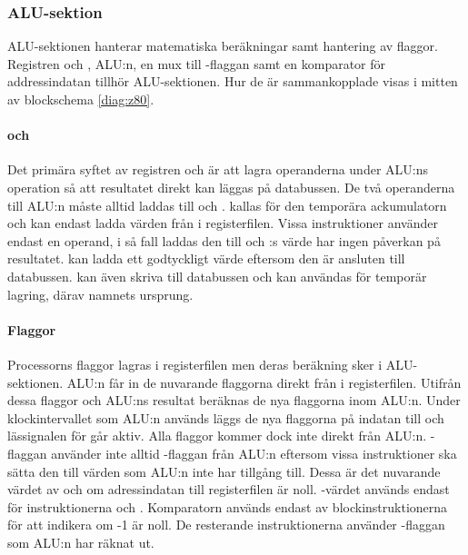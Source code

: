 \documentclass[main.tex]{subfiles}
\begin{document}
\newpage
\subsubsection{ALU-sektion}
ALU-sektionen hanterar matematiska beräkningar samt hantering av flaggor.
Registren  och , ALU:n, en mux till -flaggan samt
en komparator för addressindatan tillhör ALU-sektionen. Hur de är
sammankopplade visas i mitten av blockschema \ref{diag:z80}.

\paragraph{ och }
Det primära syftet av registren  och  är att lagra
operanderna under ALU:ns operation så att resultatet direkt kan läggas på
databussen. De två operanderna till ALU:n måste alltid laddas till 
och .  kallas för den temporära ackumulatorn och kan endast
ladda värden från  i registerfilen. Vissa instruktioner använder endast
en operand, i så fall laddas den till  och :s värde har
ingen påverkan på resultatet.  kan ladda ett godtyckligt värde
eftersom den är ansluten till databussen.  kan även skriva till
databussen och kan användas för temporär lagring, därav namnets ursprung.

\paragraph{Flaggor}
Processorns flaggor lagras i registerfilen men deras beräkning sker i
ALU-sektionen. ALU:n får in de nuvarande flaggorna direkt från  i
registerfilen. Utifrån dessa flaggor och ALU:ns resultat beräknas de nya
flaggorna inom ALU:n. Under klockintervallet som ALU:n används läggs de nya
flaggorna på indatan till  och lässignalen för  går aktiv.
Alla flaggor kommer dock inte direkt från ALU:n. -flaggan använder inte
alltid -flaggan från ALU:n eftersom vissa instruktioner ska sätta den
till värden som ALU:n inte har tillgång till. Dessa är det nuvarande värdet av
 och om adressindatan till registerfilen är noll. -värdet
används endast för instruktionerna  och . Komparatorn
används endast av blockinstruktionerna för att indikera om -1 är noll.
De resterande instruktionerna använder -flaggan som ALU:n har räknat
ut.
\end{document}
